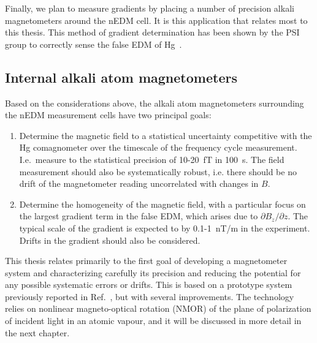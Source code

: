 Finally, we plan to measure gradients by placing a number of precision
alkali magnetometers around the nEDM cell.  It is this application
that relates most to this thesis.  This method of gradient
determination has been shown by the PSI group to correctly sense the
false EDM of Hg~\cite{bib:afach2015}.

\subsection{Internal alkali atom magnetometers}

Based on the considerations above, the alkali atom magnetometers
surrounding the nEDM measurement cells have two principal goals:
\begin{enumerate}
\item Determine the magnetic field to a statistical uncertainty
  competitive with the Hg comagnometer over the timescale of the
  frequency cycle measurement.  I.e.~measure to the statistical
  precision of 10-20~fT in 100~s.  The field measurement should also
  be systematically robust, i.e. there should be no drift of the
  magnetometer reading uncorrelated with changes in $B$.
\item Determine the homogeneity of the magnetic field, with a
  particular focus on the largest gradient term in the false EDM,
  which arises due to $\partial B_z/\partial z$.  The typical scale of
  the gradient is expected to by 0.1-1~nT/m in the experiment.  Drifts
  in the gradient should also be considered.
\end{enumerate}
This thesis relates primarily to the first goal of developing a
magnetometer system and characterizing carefully its precision and
reducing the potential for any possible systematic errors or drifts.
This is based on a prototype system previously reported in
Ref.~\cite{bib:our-nmor-paper}, but with several improvements.  The
technology relies on nonlinear magneto-optical rotation (NMOR) of the
plane of polarization of incident light in an atomic vapour, and it
will be discussed in more detail in the next chapter.




